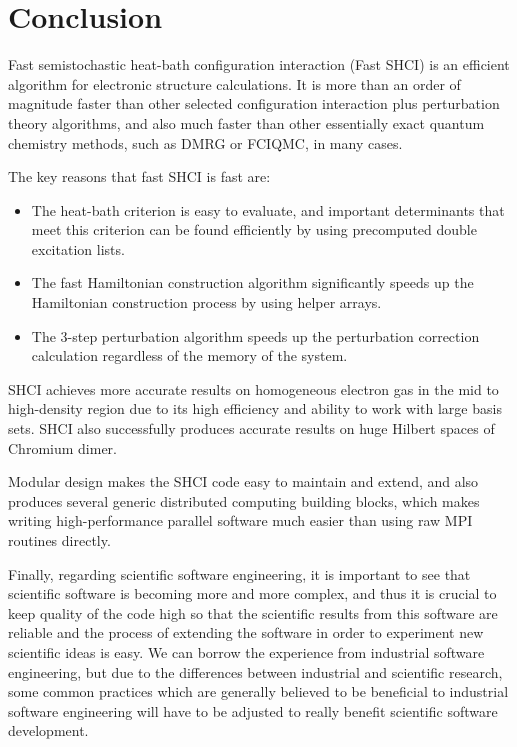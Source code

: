 \documentclass[phd,tocprelim]{cornell}
\begin{document}







\chapter{Conclusion}
\label{ch:con}

Fast semistochastic heat-bath configuration interaction (Fast SHCI) is an efficient algorithm for electronic structure calculations.
It is more than an order of magnitude faster than other selected configuration interaction plus perturbation theory algorithms, and also much faster than other essentially exact quantum chemistry methods, such as DMRG or FCIQMC, in many cases.

The key reasons that fast SHCI is fast are:
\begin{itemize}
    \item The heat-bath criterion is easy to evaluate, and important determinants that meet this criterion can be found efficiently by using precomputed double excitation lists.
    \item The fast Hamiltonian construction algorithm significantly speeds up the Hamiltonian construction process by using helper arrays.
    \item The 3-step perturbation algorithm speeds up the perturbation correction calculation regardless of the memory of the system.
\end{itemize}

SHCI achieves more accurate results on homogeneous electron gas in the mid to high-density region due to its high efficiency and ability to work with large basis sets.
SHCI also successfully produces accurate results on huge Hilbert spaces of Chromium dimer.

Modular design makes the SHCI code easy to maintain and extend, and also produces several generic distributed computing building blocks, which makes writing high-performance parallel software much easier than using raw MPI routines directly.

Finally, regarding scientific software engineering, it is important to see that scientific software is becoming more and more complex, and thus it is crucial to keep quality of the code high so that the scientific results from this software are reliable and the process of extending the software in order to experiment new scientific ideas is easy.
We can borrow the experience from industrial software engineering, but due to the differences between industrial and scientific research, some common practices which are generally believed to be beneficial to industrial software engineering will have to be adjusted to really benefit scientific software development.


\end{document}
